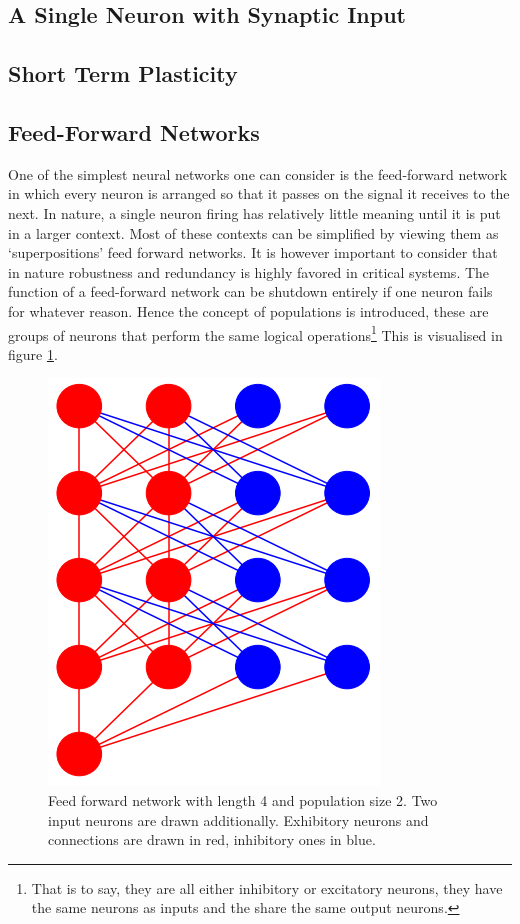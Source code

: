 \documentclass[10pt,a4paper]{article}
\begin{document}
\subsection{A Single Neuron with Synaptic Input}

\subsection{Short Term Plasticity}

\subsection{Feed-Forward Networks}
One of the simplest neural networks one can consider is the feed-forward
network in which every neuron is arranged so that it passes on the signal it
receives to the next. In nature, a single neuron firing has relatively little
meaning until it is put in a larger context. Most of these contexts can be
simplified by viewing them as `superpositions' feed forward networks. It is
however important to consider that in nature robustness and redundancy is
highly favored in critical systems. The function of a feed-forward network can
be shutdown entirely if one neuron fails for whatever reason. Hence the concept
of populations is introduced, these are groups of neurons that perform the same
logical operations\footnote{That is to say, they are all either inhibitory or
excitatory neurons, they have the same neurons as inputs and the share the same
output neurons.} This is visualised in figure \ref{fig:feed-forward}.

\begin{figure}
    \centering
    \includegraphics[width=.3\textwidth]{figures/feedforwardnetwork-cropped.png}
    \caption{Feed forward network with length 4 and population size 2. Two input
        neurons are drawn additionally. Exhibitory neurons and connections are drawn
        in red, inhibitory ones in blue.}
    \label{fig:feed-forward}
\end{figure}
\end{document}
